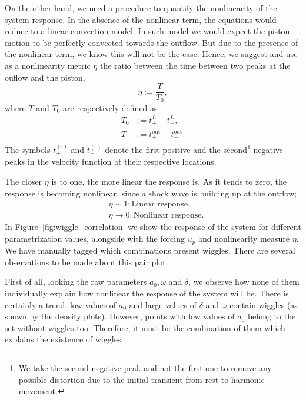 \documentclass[../../thesis.tex]{subfiles}
\begin{document}
On the other hand, we need a procedure to quantify the nonlinearity of the system response.
In the absence of the nonlinear term, the equations would reduce to a linear convection model.
In such model we would expect the piston motion to be perfectly convected towards the outflow.
But due to the presence of the nonlinear term, we know this will not be the case.
Hence, we suggest and use as a nonlinearity metric $\eta$ the ratio between the time between two peaks at the ouflow and the piston,
\begin{equation}
    \eta := \frac{T}{T_0},
\end{equation}
where $T$ and $T_0$ are respectively defined as
\begin{subequations}
    \begin{align}
        T_0 &:= t^{L}_{+} - t^{L}_{-},
        \\
        T   &:= t^{\text{out}}_{+} - t^{\text{out}}_{-}.
    \end{align}
\end{subequations}
The symbols $t^{(\cdot)}_{+}$ and $t^{(\cdot)}_{-}$ denote the first positive and the second\footnote{We take the second negative peak and not the first one to remove any possible distortion due to the initial transient from rest to harmonic movement.} negative peaks in the velocity function at their respective locations.

The closer $\eta$ is to one, the more linear the response is.
As it tends to zero, the response is becoming nonlinear, 
since a shock wave is building up at the outflow;
\begin{align*}
    &\eta \sim 1 : \text{Linear response}, 
    \\
    &\eta \rightarrow 0 : \text{Nonlinear response}.
\end{align*}
In Figure~\ref{fig:wiggle_correlation} we show the response of the system for different parametrization values, alongside with the forcing $u_p$ and nonlinearity measure $\eta$. 
We have manually tagged which combinations present wiggles.
There are several observations to be made about this pair plot.

First of all, looking the raw parameters $a_0, \omega$ and $\delta$, we observe how 
none of them individually explain how nonlinear the response of the system will be.
There is certainly a trend, low values of $a_0$ and large values of $\delta$ and $\omega$ contain wiggles (as shown by the density plots). 
However, points with low values of $a_0$ belong to the set without wiggles too. 
Therefore, it must be the combination of them which explains the existence of wiggles.
\end{document}
